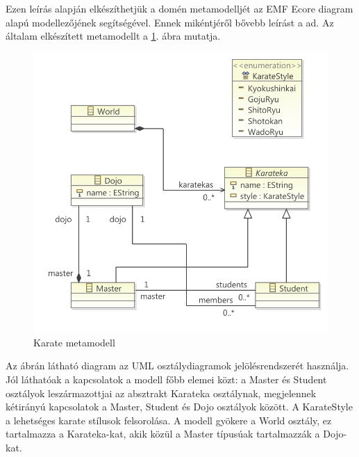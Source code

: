 Ezen leírás alapján elkészíthetjük a domén metamodelljét az \gls{EMF} Ecore diagram alapú modellezőjének segítségével.
Ennek mikéntjéről bővebb leírást a \cite{VogelEMF} ad.
Az általam elkészített metamodellt a \ref{fig:karateMetaModel}. ábra mutatja.
%
\begin{figure}[htb]
\centering
\includegraphics[width=\textwidth]{figures/ecore-karate-metamodel-diag.pdf}
\caption{Karate metamodell}
\label{fig:karateMetaModel}
\end{figure}
%
Az ábrán látható diagram az UML osztálydiagramok jelölésrendszerét használja.
Jól láthatóak a kapcsolatok a modell főbb elemei közt: a Master és Student osztályok leszármazottjai az absztrakt Karateka osztálynak, megjelennek kétirányú kapcsolatok a Master, Student és Dojo osztályok között.
A KarateStyle a lehetséges karate stílusok felsorolása.
A modell gyökere a World osztály, ez tartalmazza a Karateka-kat, akik közül a Master típusúak tartalmazzák a Dojo-kat.

